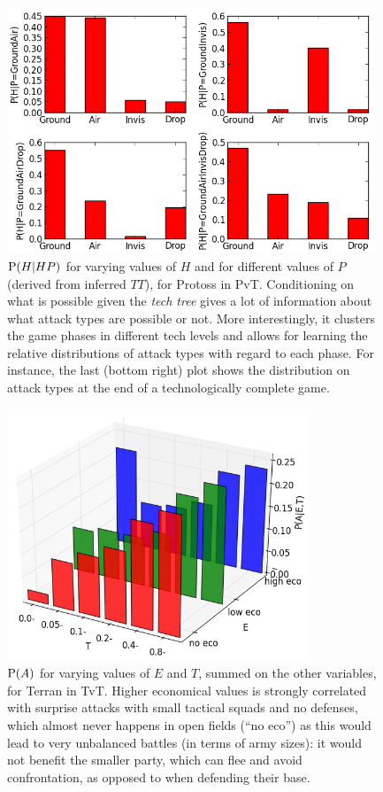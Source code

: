 \begin{figure}[htp]
\centerline{\includegraphics[width=11cm]{images/PossibleP.png}}
\caption{$\mathrm{P}(H|HP)$ for varying values of $H$ and for different values of $P$ (derived from inferred $TT$), for Protoss in PvT. Conditioning on what is possible given the \textit{tech tree} gives a lot of information about what attack types are possible or not. More interestingly, it clusters the game phases in different tech levels and allows for learning the relative distributions of attack types with regard to each phase. For instance, the last (bottom right) plot shows the distribution on attack types at the end of a technologically complete game.}
\label{fig:PossibleP}
\end{figure}

\begin{figure}[htp]
\centerline{\includegraphics[width=9cm]{images/where3D_EI_TI_RegT.png}}
\caption{$\mathrm{P}(A)$ for varying values of $E$ and $T$, summed on the other variables, for Terran in TvT. Higher economical values is strongly correlated with surprise attacks with small tactical squads and no defenses, which almost never happens in open fields (``no eco'') as this would lead to very unbalanced battles (in terms of army sizes): it would not benefit the smaller party, which can flee and avoid confrontation, as opposed to when defending their base.}
\label{fig:Where3D}
\end{figure}

